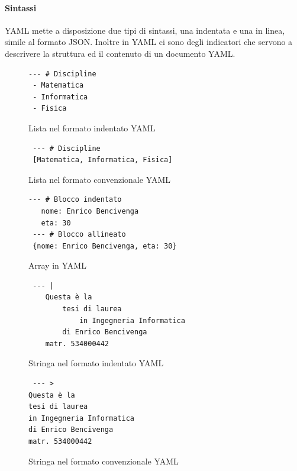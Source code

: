 \paragraph{Sintassi}
YAML mette a disposizione due tipi di sintassi, una indentata e una in linea, simile al formato JSON.
Inoltre in YAML ci sono degli indicatori che servono a descrivere la struttura ed il contenuto di un documento YAML.

\begin{figure}
\lstset{language=YAML}
\begin{lstlisting}
--- # Discipline
 - Matematica
 - Informatica
 - Fisica
\end{lstlisting}
\caption{Lista nel formato indentato YAML\label{yamllistaimage}}
\end{figure}

\begin{figure}
\lstset{language=YAML}
\begin{lstlisting}
 --- # Discipline
 [Matematica, Informatica, Fisica]
\end{lstlisting}
\caption{Lista nel formato convenzionale YAML\label{yamllistbimage}}
\end{figure}

\begin{figure}
\lstset{language=YAML}
\begin{lstlisting}
--- # Blocco indentato
   nome: Enrico Bencivenga
   eta: 30
 --- # Blocco allineato
 {nome: Enrico Bencivenga, eta: 30}
\end{lstlisting}
\caption{Array in YAML\label{yamlarrayimage}}
\end{figure}

\begin{figure}
\lstset{language=YAML}
\begin{lstlisting}
 --- |
	Questa è la 
		tesi di laurea
			in Ingegneria Informatica
		di Enrico Bencivenga
	matr. 534000442
\end{lstlisting}
\caption{Stringa nel formato indentato YAML\label{yamlstringaimage}}
\end{figure}

\begin{figure}
\lstset{language=YAML}
\begin{lstlisting}
 --- >
Questa è la 
tesi di laurea
in Ingegneria Informatica
di Enrico Bencivenga
matr. 534000442
\end{lstlisting}
\caption{Stringa nel formato convenzionale YAML\label{yamlstringbimage}}
\end{figure}

